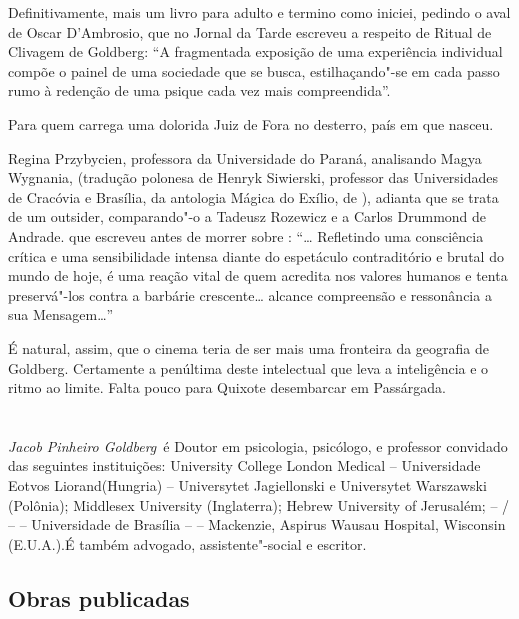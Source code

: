 Definitivamente, mais um livro para adulto e termino como iniciei,
pedindo o aval de Oscar D'Ambrosio, que no Jornal da Tarde escreveu a
respeito de Ritual de Clivagem de Goldberg: ``A fragmentada exposição de
uma experiência individual compõe o painel de uma sociedade que se
busca, estilhaçando"-se em cada passo rumo à redenção de uma psique cada
vez mais compreendida''.

Para quem carrega uma dolorida Juiz de Fora no desterro, país em que
nasceu.

Regina Przybycien, professora da Universidade do Paraná, analisando
Magya Wygnania, (tradução polonesa de Henryk Siwierski, professor das
Universidades de Cracóvia e Brasília, da antologia Mágica do Exílio, de
), adianta que se trata de um outsider, comparando"-o a Tadeusz
Rozewicz e a Carlos Drummond de Andrade.  que escreveu antes de
morrer sobre : ``… Refletindo uma consciência crítica e uma
sensibilidade intensa diante do espetáculo contraditório e brutal do
mundo de hoje, é uma reação vital de quem acredita nos valores humanos e
tenta preservá"-los contra a barbárie crescente… \redondo{[…]}
alcance compreensão e ressonância a sua Mensagem…''

É natural, assim, que o cinema teria de ser mais uma fronteira da
geografia de Goldberg. Certamente a penúltima deste intelectual que leva
a inteligência e o ritmo ao limite. Falta pouco para Quixote desembarcar
em Passárgada.

 

\chapter*{\mbox{}} 

\emph{Jacob Pinheiro Goldberg}~é Doutor em psicologia, psicólogo, e
professor convidado das seguintes instituições:
University College London Medical -- Universidade Eotvos
Liorand(Hungria) -- Universytet Jagiellonski e Universytet Warszawski
(Polônia); Middlesex University (Inglaterra); Hebrew University of
Jerusalém;  -- / --  -- Universidade de Brasília --  --
Mackenzie, Aspirus Wausau Hospital, Wisconsin (E.U.A.).É também
advogado, assistente"-social e escritor.

 

\section{Obras publicadas}

